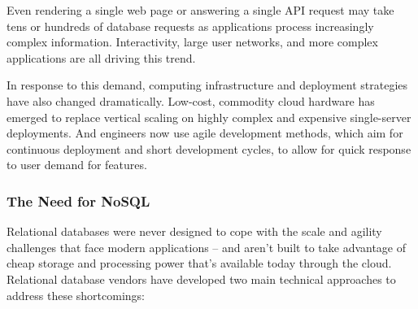 Even rendering a single web page or answering a single API request may take tens or hundreds of database requests as applications process increasingly complex information. Interactivity, large user networks, and more complex applications are all driving this trend.

In response to this demand, computing infrastructure and deployment strategies have also changed dramatically. Low-cost, commodity cloud hardware has emerged to replace vertical scaling on highly complex and expensive single-server deployments. And engineers now use agile development methods, which aim for continuous deployment and short development cycles, to allow for quick response to user demand for features.

\subsubsection{The Need for NoSQL}

Relational databases were never designed to cope with the scale and agility challenges that face modern applications – and aren't built to take advantage of cheap storage and processing power that's available today through the cloud. Relational database vendors have developed two main technical approaches to address these shortcomings:
